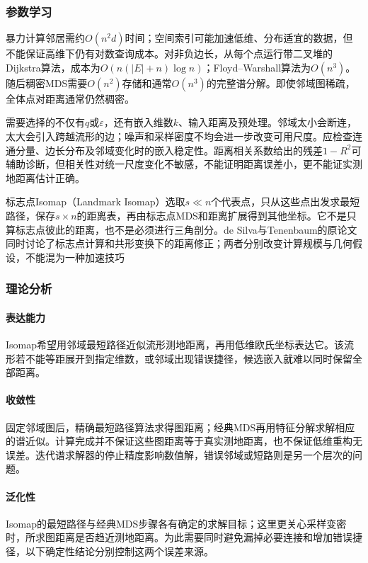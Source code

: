 \subsubsection{参数学习}

暴力计算邻居需约$O(n^2d)$时间；空间索引可能加速低维、分布适宜的数据，但不能保证高维下仍有对数查询成本。对非负边长，从每个点运行带二叉堆的Dijkstra算法，成本为$O(n(|E|+n)\log n)$；Floyd--Warshall算法为$O(n^3)$。随后稠密MDS需要$O(n^2)$存储和通常$O(n^3)$的完整谱分解。即使邻域图稀疏，全体点对距离通常仍然稠密。

需要选择的不仅有$q$或$\varepsilon$，还有嵌入维数$k$、输入距离及预处理。邻域太小会断连，太大会引入跨越流形的边；噪声和采样密度不均会进一步改变可用尺度。应检查连通分量、边长分布及邻域变化时的嵌入稳定性。距离相关系数给出的残差$1-R^2$可辅助诊断，但相关性对统一尺度变化不敏感，不能证明距离误差小，更不能证实测地距离估计正确。

标志点Isomap（Landmark Isomap）选取$s\ll n$个代表点，只从这些点出发求最短路径，保存$s\times n$的距离表，再由标志点MDS和距离扩展得到其他坐标。它不是只算标志点彼此的距离，也不是必须进行三角剖分。de Silva与Tenenbaum的原论文同时讨论了标志点计算和共形变换下的距离修正；两者分别改变计算规模与几何假设，不能混为一种加速技巧

\subsubsection{理论分析}
\label{sec:dim-isomap-theory}

\paragraph{表达能力}
Isomap希望用邻域最短路径近似流形测地距离，再用低维欧氏坐标表达它。该流形若不能等距展开到指定维数，或邻域出现错误捷径，候选嵌入就难以同时保留全部距离。

\paragraph{收敛性}
固定邻域图后，精确最短路径算法求得图距离；经典MDS再用特征分解求解相应的谱近似。计算完成并不保证这些图距离等于真实测地距离，也不保证低维重构无误差。迭代谱求解器的停止精度影响数值解，错误邻域或短路则是另一个层次的问题。

\paragraph{泛化性}
Isomap的最短路径与经典MDS步骤各有确定的求解目标；这里更关心采样变密时，所求图距离是否趋近测地距离。为此需要同时避免漏掉必要连接和增加错误捷径，以下确定性结论分别控制这两个误差来源。

